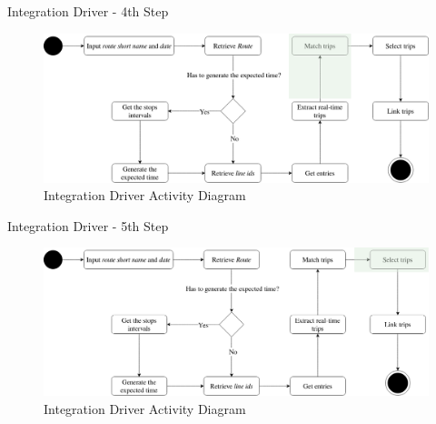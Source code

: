\documentclass[xcolor=dvipsnames,table]{beamer}
\begin{document}
\begin{frame}{Integration Driver - 4th Step}
        \begin{figure}[H]
                \centering
                \includegraphics[width = \textwidth]{images/integrationDriverAD(4th_step).png}
                \caption{Integration Driver Activity Diagram}
        \end{figure}
\end{frame}

\begin{frame}{Integration Driver - 5th Step}
        \begin{figure}[H]
                \centering
                \includegraphics[width = \textwidth]{images/integrationDriverAD(5th_step).png}
                \caption{Integration Driver Activity Diagram}
        \end{figure}
\end{frame}
\end{document}
